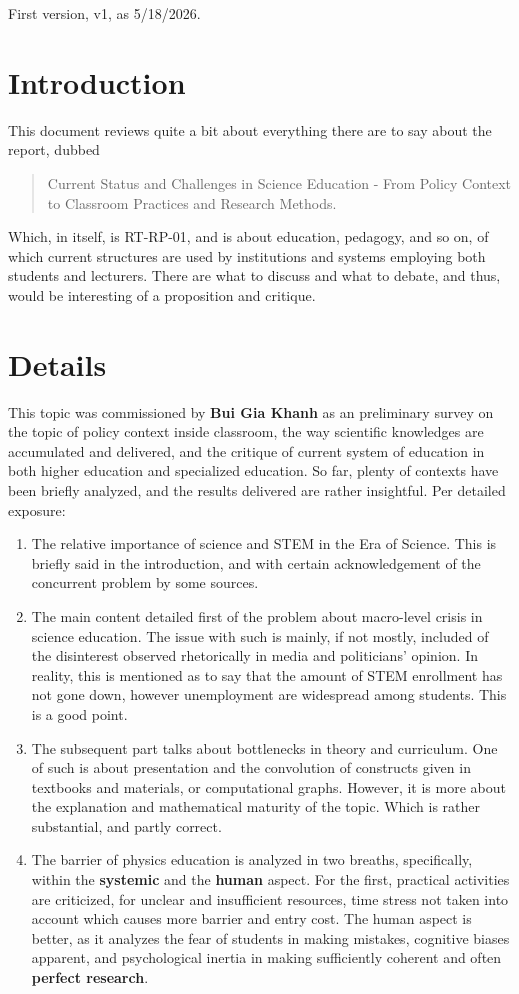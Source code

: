 \documentclass[10pt,a4paper]{article}
\begin{document}
First version, v1, as 5/18/2026. 

\section{Introduction}

This document reviews quite a bit about everything there are to say about the report, dubbed
\begin{quote}
    Current Status and Challenges in Science Education - From Policy Context to Classroom Practices and Research Methods.
\end{quote}
Which, in itself, is RT-RP-01, and is about education, pedagogy, and so on, of which current structures are used by institutions and systems employing both students and lecturers. There are what to discuss and what to debate, and thus, would be interesting of a proposition and critique. 

\section{Details}

This topic was commissioned by \textbf{Bui Gia Khanh} as an preliminary survey on the topic of policy context inside classroom, the way scientific knowledges are accumulated and delivered, and the critique of current system of education in both higher education and specialized education. So far, plenty of contexts have been briefly analyzed, and the results delivered are rather insightful. Per detailed exposure:

\begin{enumerate}
    \item The relative importance of science and STEM in the Era of Science. This is briefly said in the introduction, and with certain acknowledgement of the concurrent problem by some sources. 
    \item The main content detailed first of the problem about macro-level crisis in science education. The issue with such is mainly, if not mostly, included of the disinterest observed rhetorically in media and politicians' opinion. In reality, this is mentioned as to say that the amount of STEM enrollment has not gone down, however unemployment are widespread among students. This is a good point. 
    \item The subsequent part talks about bottlenecks in theory and curriculum. One of such is about presentation and the convolution of constructs given in textbooks and materials, or computational graphs. However, it is more about the explanation and mathematical maturity of the topic. Which is rather substantial, and partly correct. 
    \item The barrier of physics education is analyzed in two breaths, specifically, within the \textbf{systemic} and the \textbf{human} aspect. For the first, practical activities are criticized, for unclear and insufficient resources, time stress not taken into account which causes more barrier and entry cost. The human aspect is better, as it analyzes the fear of students in making mistakes, cognitive biases apparent, and psychological inertia in making sufficiently coherent and often \textbf{perfect research}.
\end{enumerate}
\end{document}
